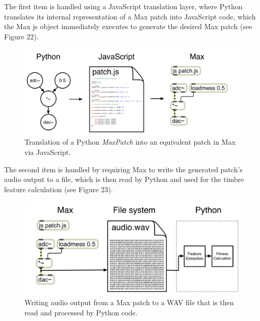 \documentclass[12pt]{report} 	%
\numberwithin{figure}{chapter}
\numberwithin{table}{chapter}
\numberwithin{equation}{chapter}
\begin{document}
\begin{flushleft}
The first item is handled using a JavaScript translation layer, where Python translates its internal representation of a Max patch into JavaScript code, which the Max js object immediately executes to generate the desired Max patch (see Figure 22). 
\begin{figure}[h!]
\vspace{24pt}
\begin{center}
\includegraphics[scale=0.4]{JSTranslation}
\caption[Generating a Max patch given a Python tree]{Translation of a Python \textit{MaxPatch} into an equivalent patch in Max via JavaScript.}
\end{center}
\vspace{6pt}
\end{figure}

The second item is handled by requiring Max to write the generated patch's audio output to a file, which is then read by Python and used for the timbre feature calculation (see Figure 23).
\begin{figure}[h!]
\begin{center}
\vspace{24pt}
\includegraphics[scale=0.4]{MaxAudioToPython}
\caption[From Max to Python]{Writing audio output from a Max patch to a WAV file that is then read and processed by Python code.}
\end{center}
\vspace{6pt}
\end{figure}


\end{flushleft}
\end{document}

